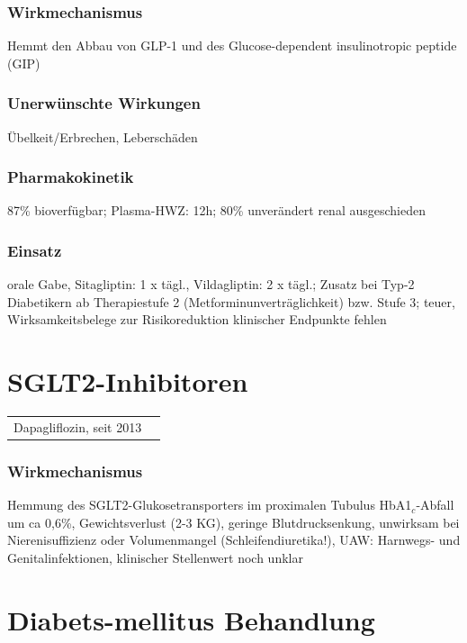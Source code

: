 \documentclass[10pt,a4paper]{report}
\begin{document}
\subsubsection{Wirkmechanismus} %
\label{par:wirkmechanismus}
Hemmt den Abbau von GLP-1 und des
Glucose-dependent insulinotropic peptide (GIP)
\subsubsection{Unerwünschte Wirkungen} %
\label{par:unerw_nschte_wirkungen}
Übelkeit/Erbrechen, Leberschäden 
\subsubsection{Pharmakokinetik} %
\label{par:pharmakokinetik}
87\% bioverfügbar; Plasma-HWZ: 12h; 80\% unverändert renal ausgeschieden 
\subsubsection{Einsatz} %
\label{par:einsatz}
orale Gabe, Sitagliptin: 1 x tägl., Vildagliptin: 2 x tägl.; Zusatz bei Typ-2 Diabetikern ab Therapiestufe 2 (Metforminunverträglichkeit) bzw. Stufe 3; teuer, Wirksamkeitsbelege zur Risikoreduktion klinischer Endpunkte fehlen
\section{SGLT2-Inhibitoren} %
\label{sec:sglt2_inhibitoren}
\begin{tabularx}{\textwidth}{XX}
Dapagliflozin, seit 2013\\
\end{tabularx}
\subsubsection{Wirkmechanismus} %
\label{par:wirkmechanismus}
Hemmung des SGLT2-Glukosetransporters im proximalen Tubulus 
HbA1$_c$-Abfall um ca 0,6\%, Gewichtsverlust (2-3 KG), geringe Blutdrucksenkung, unwirksam bei Nierenisuffizienz oder Volumenmangel (Schleifendiuretika!), UAW: Harnwegs- und Genitalinfektionen, klinischer Stellenwert noch unklar
\section{Diabets-mellitus Behandlung} %
\label{sec:diabets_mellitus_behandlung}
\end{document}
